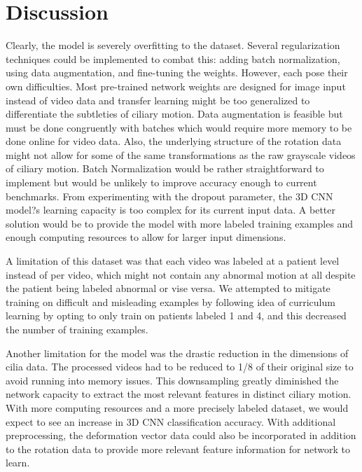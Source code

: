 \section{Discussion}

Clearly, the model is severely overfitting to the dataset. Several regularization techniques could be implemented to combat this: adding batch normalization, using data augmentation, and fine-tuning the weights. However, each pose their own difficulties. Most pre-trained network weights are designed for image input instead of video data and transfer learning \cite{pan2010survey} might be too generalized to differentiate the subtleties of ciliary motion. Data augmentation is feasible but must be done congruently with batches which would require more memory to be done online for video data. Also, the underlying structure of the rotation data might not allow for some of the same transformations as the raw grayscale videos of ciliary motion. Batch Normalization \cite{ioffe2015batch} would be rather straightforward to implement but would be unlikely to improve accuracy enough to current benchmarks. From experimenting with the dropout parameter, the 3D CNN model?s learning capacity is too complex for its current input data. A better solution would be to provide the model with more labeled training examples and enough computing resources to allow for larger input dimensions. 
 
A limitation of this dataset was that each video was labeled at a patient level instead of per video, which might not contain any abnormal motion at all despite the patient being labeled abnormal or vise versa. We attempted to mitigate training on difficult and misleading examples by following \cite {bengio2009curriculum} idea of curriculum learning by opting to only train on patients labeled 1 and 4, and this decreased the number of training examples.

Another limitation for the model was the drastic reduction in the dimensions of cilia data. The processed videos had to be reduced to 1/8 of their original size to avoid running into memory issues. This downsampling greatly diminished the network capacity to extract the most relevant features in distinct ciliary motion. With more computing resources and a more precisely labeled dataset, we would expect to see an increase in 3D CNN classification accuracy. With additional preprocessing, the deformation vector data could also be incorporated in addition to the rotation data to provide more relevant feature information for network to learn.


